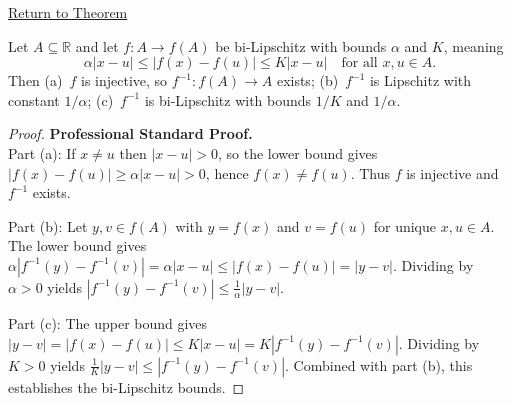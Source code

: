 \newpage
{}
\label{prf:bilipschitz-inverse-is-lipschitz}

\begin{remark*}[Return]
\hyperref[thm:bilipschitz-inverse-is-lipschitz]{Return to Theorem}
\end{remark*}

\begin{theorem*}
Let $A \subseteq \mathbb{R}$ and let $f : A \to f(A)$ be bi-Lipschitz with bounds $\alpha$ and $K$, meaning
\[
  \alpha|x - u| \leq |f(x) - f(u)| \leq K|x - u|
  \quad \text{for all } x, u \in A.
\]
Then (a)~$f$ is injective, so $f^{-1} : f(A) \to A$ exists; (b)~$f^{-1}$ is Lipschitz with constant $1/\alpha$; (c)~$f^{-1}$ is bi-Lipschitz with bounds $1/K$ and $1/\alpha$.
\end{theorem*}

\begin{proof}
\textbf{Professional Standard Proof.}~\\
Part (a): If $x \neq u$ then $|x - u| > 0$, so the lower bound gives $|f(x) - f(u)| \geq \alpha|x - u| > 0$, hence $f(x) \neq f(u)$. Thus $f$ is injective and $f^{-1}$ exists.

Part (b): Let $y, v \in f(A)$ with $y = f(x)$ and $v = f(u)$ for unique $x, u \in A$. The lower bound gives $\alpha|f^{-1}(y) - f^{-1}(v)| = \alpha|x - u| \leq |f(x) - f(u)| = |y - v|$. Dividing by $\alpha > 0$ yields $|f^{-1}(y) - f^{-1}(v)| \leq \frac{1}{\alpha}|y - v|$.

Part (c): The upper bound gives $|y - v| = |f(x) - f(u)| \leq K|x - u| = K|f^{-1}(y) - f^{-1}(v)|$. Dividing by $K > 0$ yields $\frac{1}{K}|y - v| \leq |f^{-1}(y) - f^{-1}(v)|$. Combined with part (b), this establishes the bi-Lipschitz bounds.
\end{proof}

